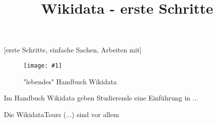 \documentclass{article}
\newlength{\imgwidth}
\newcommand\scaledgraphics[2]{%
                
\settowidth{\imgwidth}{\texttt{[image: \#1]}}%
                
\setlength{\imgwidth}{\minof{\imgwidth}{#2\textwidth}}%
                
\texttt{[image: \#1]}%
                
}
\begin{document}
\title{Wikidata - erste Schritte}

\maketitle





[erste Schritte, einfache Sachen, Arbeiten mit]

\begin{figure}
\scaledgraphics{c974b28d-908a-42e2-9445-5efb50e2817b.png}{1}
\caption*{"lebendes" Handbuch Wikidata}\label{F44920591}
\end{figure}





Im Handbuch Wikidata \autocite{solohub_handbuch_2021} geben Studierende eine Einführung in ...


Die WikidataTours (...) sind vor allem


\printbibliography[title={Literaturverzeichnis}]
\end{document}
